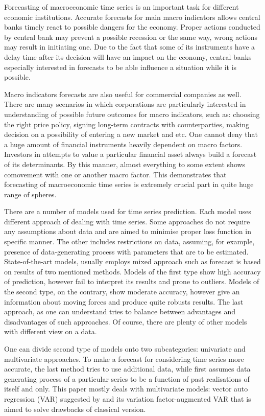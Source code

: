 \documentclass[a4paper, 14pt]{article}
\begin{document}
Forecasting of macroeconomic time series is an important task for different economic institutions. Accurate forecasts for main macro indicators allows central banks timely react to possible dangers for the economy. Proper actions conducted by central bank may prevent a possible recession or the same way, wrong actions may result in initiating one. Due to the fact that some of its instruments have a delay time after its decision will have an impact on the economy, central banks especially interested in forecasts to be able influence a situation while it is possible. 

Macro indicators forecasts are also useful for commercial companies as well. There are many scenarios in which corporations are particularly interested in understanding of possible future outcomes for macro indicators, such as: choosing the right price policy, signing long-term contracts with counterparties, making decision on a possibility of entering a new market and etc. One cannot deny that a huge amount of financial instruments heavily dependent on macro factors. Investors in attempts to value a particular financial asset always build a forecast of its determinants. By this manner, almost everything to some extent shows comovement with one or another macro factor. This demonstrates that forecasting of macroeconomic time series is extremely crucial part in quite huge range of spheres.  

There are a number of models used for time series prediction. Each model uses different approach of dealing with time series. Some approaches do not require any assumptions about data and are aimed to minimise proper loss function in specific manner. The other includes restrictions on data, assuming, for example, presence of data-generating process with parameters that are to be estimated. State-of-the-art models, usually employs mixed approach such as forecast is based on results of two mentioned methods. Models of the first type show high accuracy of prediction, however fail to interpret its results and prone to outliers. Models of the second type, on the contrary, show moderate accuracy, however give an information about moving forces and produce quite robusts results. The last approach, as one can understand tries to balance between advantages and disadvantages of such approaches. Of course, there are plenty of other models with different view on a data. 

One can divide second type of models onto two subcategories: univariate and multivariate approaches. To make a forecast for considering time series more accurate, the last method tries to use additional data, while first assumes data generating process of a particular series to be a function of past realisations of itself and only. This paper mostly deals with multivariate models: vector auto regression (VAR) suggested by \cite{sims1980martingale} and its variation factor-augmented VAR that is aimed to solve drawbacks of classical version.  
\end{document}
